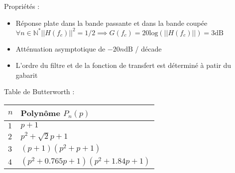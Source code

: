 \documentclass[a4paper,12pt]{article}
\begin{document}
Propriétés :

\begin{itemize}
    \item Réponse plate dans la bande passante et dans la bande coupée \\
    $\forall n \in \mathbb{N}^* ||H(f_c)||^2 = 1/2 \implies G(f_c) = 20 \mathrm{log}(||H(f_c)||) = 3 \mathrm{dB}$
    \item Atténuation asymptotique de $-20n \mathrm{dB}$ / décade
    \item L'ordre du filtre et de la fonction de transfert est déterminé à patir du gabarit
\end{itemize}

Table de Butterworth :

\begin{tabular}{|l|l|}
    \hline
    $n$ & Polynôme $P_n(p)$ \\
    \hline
    $1$ & $p+1$ \\
    $2$ & $p^2 + \sqrt{2}p + 1$ \\
    $3$ & $(p+1)(p^2 + p + 1)$ \\
    $4$ & $(p^2 + 0.765p + 1)(p^2 + 1.84p + 1)$ \\
    \hline
\end{tabular}
\end{document}
